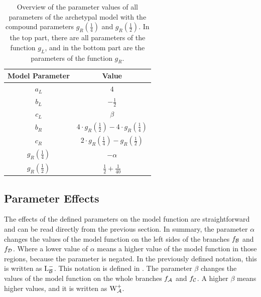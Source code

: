 \begin{table}
	\centering
	\begin{tabular}{|c|c|}
		\hline
		Model Parameter               & Value                                                                       \\ \hline \hline
		$a_L$                         & $4$                                                                         \\ \hline
		$b_L$                         & $-\frac{1}{2}$                                                              \\ \hline
		$c_L$                         & $\beta$                                                                     \\ \hline \hline
		$b_R$                         & $4 \cdot g_R\left(\frac{1}{2}\right) - 4 \cdot g_R\left(\frac{1}{4}\right)$ \\ \hline
		$c_R$                         & $2 \cdot g_R\left(\frac{1}{4}\right) - g_R\left(\frac{1}{2}\right)$         \\ \hline
		$g_R\left(\frac{1}{4}\right)$ & $-\alpha$                                                                   \\ \hline
		$g_R\left(\frac{1}{2}\right)$ & $\frac{1}{2} + \frac{1}{40}$                                                \\ \hline
	\end{tabular}
	\caption[Overview of parameters of the archetypal model]{
		Overview of the parameter values of all parameters of the archetypal model with the compound parameters $g_R\left(\frac{1}{4}\right)$ and $g_R\left(\frac{1}{2}\right)$.
		In the top part, there are all parameters of the function $g_L$, and in the bottom part are the parameters of the function $g_R$.
	}
	\label{table:setup.arch.parameters}
\end{table}

\subsection{Parameter Effects}
\label{sec:setup.arch.parameterfx}

The effects of the defined parameters on the model function are straightforward and can be read directly from the previous section.
In summary, the parameter $\alpha$ changes the values of the model function on the left sides of the branches $f_{\mathcal{B}}$ and $f_{\mathcal{D}}$.
Where a lower value of $\alpha$ means a higher value of the model function in those regions, because the parameter is negated.
In the previously defined notation, this is written as $\operatorname{L}_{\mathcal{B}}^-$.
This notation is defined in .
The parameter $\beta$ changes the values of the model function on the whole branches $f_{\mathcal{A}}$ and $f_{\mathcal{C}}$.
A higher $\beta$ means higher values, and it is written as $\operatorname{W}_{\mathcal{A}}^+$.

